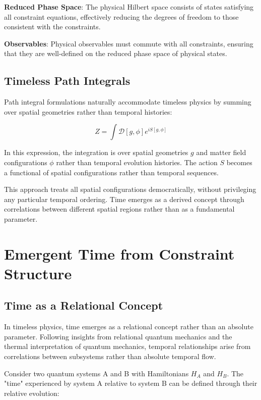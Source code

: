 \documentclass[12pt]{article}
\begin{document}
\textbf{Reduced Phase Space}: The physical Hilbert space consists of states satisfying all constraint equations, effectively reducing the degrees of freedom to those consistent with the constraints.

\textbf{Observables}: Physical observables must commute with all constraints, ensuring that they are well-defined on the reduced phase space of physical states.

\subsection{Timeless Path Integrals}

Path integral formulations naturally accommodate timeless physics by summing over spatial geometries rather than temporal histories:

\begin{equation}
Z = \int \mathcal{D}[g,\phi] e^{iS[g,\phi]}
\end{equation}

In this expression, the integration is over spatial geometries $g$ and matter field configurations $\phi$ rather than temporal evolution histories. The action $S$ becomes a functional of spatial configurations rather than temporal sequences.

This approach treats all spatial configurations democratically, without privileging any particular temporal ordering. Time emerges as a derived concept through correlations between different spatial regions rather than as a fundamental parameter.

\section{Emergent Time from Constraint Structure}

\subsection{Time as a Relational Concept}

In timeless physics, time emerges as a relational concept rather than an absolute parameter. Following insights from relational quantum mechanics and the thermal interpretation of quantum mechanics, temporal relationships arise from correlations between subsystems rather than absolute temporal flow.

Consider two quantum systems A and B with Hamiltonians $H_A$ and $H_B$. The "time" experienced by system A relative to system B can be defined through their relative evolution:
\end{document}
